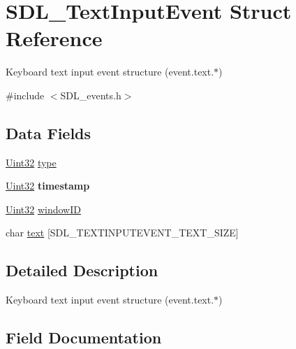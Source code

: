 \hypertarget{struct_s_d_l___text_input_event}{}\section{S\+D\+L\+\_\+\+Text\+Input\+Event Struct Reference}
\label{struct_s_d_l___text_input_event}


Keyboard text input event structure (event.\+text.$\ast$)  




{\ttfamily \#include $<$S\+D\+L\+\_\+events.\+h$>$}

\subsection*{Data Fields}
\begin{DoxyCompactItemize}
\item 
\hyperlink{_s_d_l__stdinc_8h_add440eff171ea5f55cb00c4a9ab8672d}{Uint32} \hyperlink{struct_s_d_l___text_input_event_aa40a9b05c3154032b9f2d7220e9f08dc}{type}
\item 
\hyperlink{_s_d_l__stdinc_8h_add440eff171ea5f55cb00c4a9ab8672d}{Uint32} {\bfseries timestamp}\hypertarget{struct_s_d_l___text_input_event_abf1ed7edeab81db9c05d899836a44a2f}{}\label{struct_s_d_l___text_input_event_abf1ed7edeab81db9c05d899836a44a2f}

\item 
\hyperlink{_s_d_l__stdinc_8h_add440eff171ea5f55cb00c4a9ab8672d}{Uint32} \hyperlink{struct_s_d_l___text_input_event_a78d9995068d6f40cd78bb8db7351b0a1}{window\+ID}
\item 
char \hyperlink{struct_s_d_l___text_input_event_aaef0f36c93cbd7458d7ff27dc412bbe7}{text} \mbox{[}S\+D\+L\+\_\+\+T\+E\+X\+T\+I\+N\+P\+U\+T\+E\+V\+E\+N\+T\+\_\+\+T\+E\+X\+T\+\_\+\+S\+I\+ZE\mbox{]}
\end{DoxyCompactItemize}


\subsection{Detailed Description}
Keyboard text input event structure (event.\+text.$\ast$) 

\subsection{Field Documentation}
